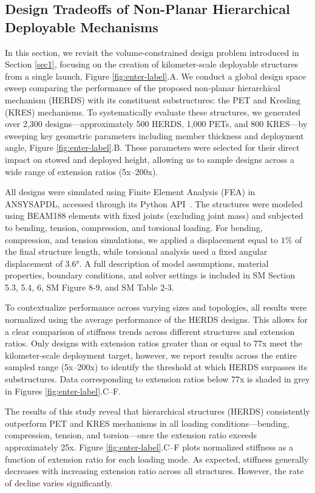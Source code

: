 \subsection{Design Tradeoffs of {Non-Planar Hierarchical Deployable}  Mechanisms}
{In this section, we revisit the volume-constrained design problem introduced in Section \ref{sec1}, focusing on the creation of kilometer-scale deployable structures from a single launch, Figure \ref{fig:enter-label}.A. We conduct a global design space sweep comparing the performance of the proposed non-planar hierarchical mechanism (HERDS) with its constituent substructures: the PET and Kresling (KRES) mechanisms. To systematically evaluate these structures, we generated over 2,300 designs—approximately 500 HERDS, 1,000 PETs, and 800 KRES—by sweeping key geometric parameters including member thickness and deployment angle, Figure \ref{fig:enter-label}.B. These parameters were selected for their direct impact on stowed and deployed height, allowing us to sample designs across a wide range of extension ratios (5x–200x).}

{All designs were simulated using Finite Element Analysis (FEA) in ANSYS\textregistered APDL\cite{ansys_inc_ansys_nodate}, accessed through its Python API~\cite{alexander_kaszynski_2020_4009467}. The structures were modeled using BEAM188 elements with fixed joints (excluding joint mass) and subjected to bending, tension, compression, and torsional loading. For bending, compression, and tension simulations, we applied a displacement equal to $1\%$ of the final structure length, while torsional analysis used a fixed angular displacement of 3.6°. A full description of model assumptions, material properties, boundary conditions, and solver settings is included in SM Section 5.3, 5.4, 6, SM Figure 8-9, and SM Table 2-3.}

{To contextualize performance across varying sizes and topologies, all results were normalized using the average performance of the HERDS designs. This allows for a clear comparison of stiffness trends across different structures and extension ratios. Only designs with extension ratios greater than or equal to 77x meet the kilometer-scale deployment target, however, we report results across the entire sampled range (5x–200x) to identify the threshold at which HERDS surpasses its substructures. Data corresponding to extension ratios below 77x is shaded in grey in Figures \ref{fig:enter-label}.C–F.}

{The results of this study reveal that hierarchical structures (HERDS) consistently outperform PET and KRES mechanisms in all loading conditions—bending, compression, tension, and torsion—once the extension ratio exceeds approximately 25x. Figure \ref{fig:enter-label}.C–F plots normalized stiffness as a function of extension ratio for each loading mode. As expected, stiffness generally decreases with increasing extension ratio across all structures. However, the rate of decline varies significantly.}

